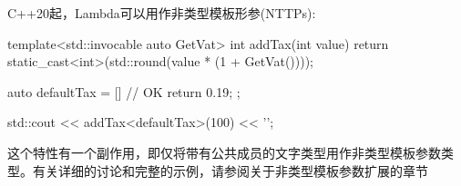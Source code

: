 C++20起，Lambda可以用作非类型模板形参(NTTPs):

\begin{cpp}
template<std::invocable auto GetVat>
int addTax(int value)
{
	return static_cast<int>(std::round(value * (1 + GetVat())));
}

auto defaultTax = [] { // OK
	return 0.19;
};

std::cout << addTax<defaultTax>(100) << '\n';
\end{cpp}

这个特性有一个副作用，即仅将带有公共成员的文字类型用作非类型模板参数类型。有关详细的讨论和完整的示例，请参阅关于非类型模板参数扩展的章节





